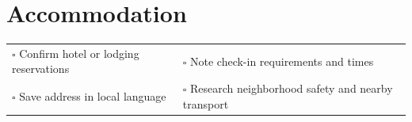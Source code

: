 
\section{Accommodation}
\label{sec:accomodation}

\begin{tabular}{p{9cm} p{8cm}}
$\square$ Confirm hotel or lodging reservations & $\square$ Note check-in requirements and times \\ 
$\square$ Save address in local language & $\square$ Research neighborhood safety and nearby transport \\ 
\end{tabular}

